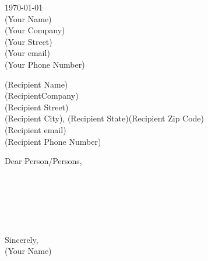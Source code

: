 \documentclass[letterpaper,12pt]{article}
\newcommand{\yourName}   {(Your Name)}
\newcommand{\yourCompany}{(Your Company)}
\newcommand{\yourStreet} {(Your Street)}
\newcommand{\yourEmail}  {(Your email)}
\newcommand{\yourPhone}  {(Your Phone Number)}
\newcommand{\recipientName}   {(Recipient Name)}
\newcommand{\recipientCompany}{(RecipientCompany)}
\newcommand{\recipientStreet} {(Recipient Street)}
\newcommand{\recipientCity}   {(Recipient City)}
\newcommand{\recipientState}  {(Recipient State)}
\newcommand{\recipientZip}    {(Recipient Zip Code)}
\newcommand{\recipientEmail}  {(Recipient email)}
\newcommand{\recipientEhone}  {(Recipient Phone Number)}
\newcommand{\recipientAddress}{
    \recipientStreet\\\recipientCity, \recipientState\enspace\recipientZip}
\newcommand{\opening}{Dear Person/Persons,}
\newcommand{\salutation}{Sincerely,}
\newcommand{\closing}{
    \bigskip
    \salutation\\
    \vspace{5em}
    \yourName
}
\renewenvironment{paragraph}{
    \bigskip
}
{\\}
\begin{document}
\begin{flushright}
    \today\\
    \bigskip
    \yourName\\
    \yourCompany\\
    \yourStreet\\
    \yourEmail\\
    \yourPhone\\
\end{flushright}

\recipientName\\
\recipientCompany\\
\recipientAddress\\
\recipientEmail\\
\recipientEhone\\

\bigskip

\opening\\

\begin{paragraph}
    \blindtext
\end{paragraph}

\begin{paragraph}
    \blindtext
\end{paragraph}

\begin{paragraph}
    \blindtext
\end{paragraph}

\closing
\end{document}
